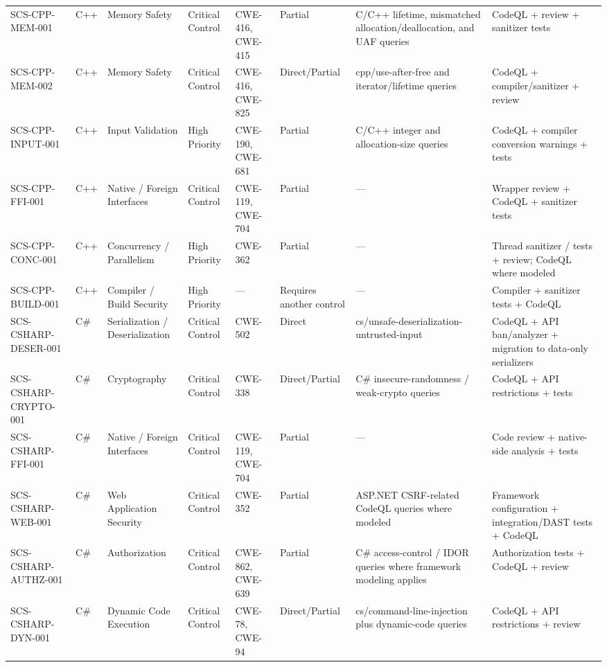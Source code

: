 \documentclass[10pt,letterpaper]{article}
\begin{document}
\begin{landscape}
\begin{longtable}{@{}P{1.0in}P{0.6in}P{0.95in}P{0.75in}P{0.85in}P{0.75in}P{2.0in}P{2.05in}@{}}
SCS-CPP-MEM-001 & C++ & Memory Safety & Critical Control & CWE-416, CWE-415 & Partial & C/C++ lifetime, mismatched allocation/deallocation, and UAF queries & CodeQL + review + sanitizer tests\\
SCS-CPP-MEM-002 & C++ & Memory Safety & Critical Control & CWE-416, CWE-825 & Direct/Partial & cpp/use-after-free and iterator/lifetime queries & CodeQL + compiler/sanitizer + review\\
SCS-CPP-INPUT-001 & C++ & Input Validation & High Priority & CWE-190, CWE-681 & Partial & C/C++ integer and allocation-size queries & CodeQL + compiler conversion warnings + tests\\
SCS-CPP-FFI-001 & C++ & Native / Foreign Interfaces & Critical Control & CWE-119, CWE-704 & Partial & --- & Wrapper review + CodeQL + sanitizer tests\\
SCS-CPP-CONC-001 & C++ & Concurrency / Parallelism & High Priority & CWE-362 & Partial & --- & Thread sanitizer / tests + review; CodeQL where modeled\\
SCS-CPP-BUILD-001 & C++ & Compiler / Build Security & High Priority & --- & Requires another control & --- & Compiler + sanitizer tests + CodeQL\\
SCS-CSHARP-DESER-001 & C\# & Serialization / Deserialization & Critical Control & CWE-502 & Direct & cs/unsafe-deserialization-untrusted-input & CodeQL + API ban/analyzer + migration to data-only serializers\\
SCS-CSHARP-CRYPTO-001 & C\# & Cryptography & Critical Control & CWE-338 & Direct/Partial & C\# insecure-randomness / weak-crypto queries & CodeQL + API restrictions + tests\\
SCS-CSHARP-FFI-001 & C\# & Native / Foreign Interfaces & Critical Control & CWE-119, CWE-704 & Partial & --- & Code review + native-side analysis + tests\\
SCS-CSHARP-WEB-001 & C\# & Web Application Security & Critical Control & CWE-352 & Partial & ASP.NET CSRF-related CodeQL queries where modeled & Framework configuration + integration/DAST tests + CodeQL\\
SCS-CSHARP-AUTHZ-001 & C\# & Authorization & Critical Control & CWE-862, CWE-639 & Partial & C\# access-control / IDOR queries where framework modeling applies & Authorization tests + CodeQL + review\\
SCS-CSHARP-DYN-001 & C\# & Dynamic Code Execution & Critical Control & CWE-78, CWE-94 & Direct/Partial & cs/command-line-injection plus dynamic-code queries & CodeQL + API restrictions + review\\

\end{longtable}
\end{landscape}
\end{document}
